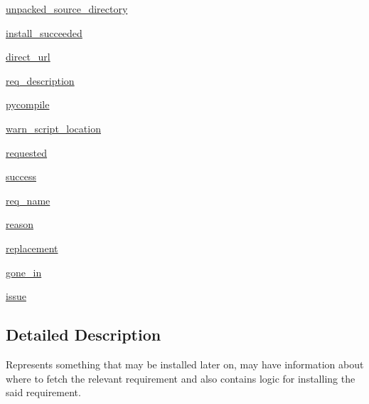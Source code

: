 \begin{DoxyCompactItemize}
\item 
\hyperlink{classpip_1_1__internal_1_1req_1_1req__install_1_1InstallRequirement_a5092d1afb79d9865de3ff615f50124f7}{unpacked\+\_\+source\+\_\+directory}
\item 
\hyperlink{classpip_1_1__internal_1_1req_1_1req__install_1_1InstallRequirement_a39282c26d8cc56df8c01d6f398aca6e0}{install\+\_\+succeeded}
\item 
\hyperlink{classpip_1_1__internal_1_1req_1_1req__install_1_1InstallRequirement_a5672e0da7a21b8a6865f6f820b616c5d}{direct\+\_\+url}
\item 
\hyperlink{classpip_1_1__internal_1_1req_1_1req__install_1_1InstallRequirement_a8ab7e8884a1fce35b99b8394112aa3e8}{req\+\_\+description}
\item 
\hyperlink{classpip_1_1__internal_1_1req_1_1req__install_1_1InstallRequirement_a0964c599eeaf8d47d4f35524b31e4129}{pycompile}
\item 
\hyperlink{classpip_1_1__internal_1_1req_1_1req__install_1_1InstallRequirement_a855e0beb9b493b03c4d8af9727a2b876}{warn\+\_\+script\+\_\+location}
\item 
\hyperlink{classpip_1_1__internal_1_1req_1_1req__install_1_1InstallRequirement_a86d90c0e56f364f8279fd414a6e808fe}{requested}
\item 
\hyperlink{classpip_1_1__internal_1_1req_1_1req__install_1_1InstallRequirement_a7d64e9f48bd8eaf90300b013b70d8723}{success}
\item 
\hyperlink{classpip_1_1__internal_1_1req_1_1req__install_1_1InstallRequirement_a6a354ccb5bccb450f525019b01723bc5}{req\+\_\+name}
\item 
\hyperlink{classpip_1_1__internal_1_1req_1_1req__install_1_1InstallRequirement_a1a2b100c3720e6de82b32b19aafb76ce}{reason}
\item 
\hyperlink{classpip_1_1__internal_1_1req_1_1req__install_1_1InstallRequirement_af4c9e7a5115e82b46170a1220cc0fc5b}{replacement}
\item 
\hyperlink{classpip_1_1__internal_1_1req_1_1req__install_1_1InstallRequirement_a089bbbd8430aa52ceeb81e826489b9e1}{gone\+\_\+in}
\item 
\hyperlink{classpip_1_1__internal_1_1req_1_1req__install_1_1InstallRequirement_a366677c29707269fcd9958e7d678d94c}{issue}
\end{DoxyCompactItemize}


\subsection{Detailed Description}
\begin{DoxyVerb}Represents something that may be installed later on, may have information
about where to fetch the relevant requirement and also contains logic for
installing the said requirement.
\end{DoxyVerb}
 

